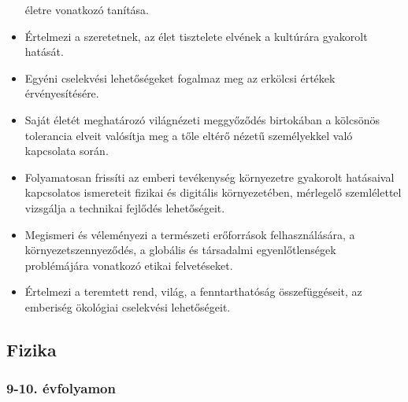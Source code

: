 \begin{itemize}
  életre vonatkozó tanítása.
\item
  Értelmezi a szeretetnek, az élet tisztelete elvének a kultúrára
  gyakorolt hatását.
\item
  Egyéni cselekvési lehetőségeket fogalmaz meg az erkölcsi értékek
  érvényesítésére.
\item
  Saját életét meghatározó világnézeti meggyőződés birtokában a
  kölcsönös tolerancia elveit valósítja meg a tőle eltérő nézetű
  személyekkel való kapcsolata során.
\item
  Folyamatosan frissíti az emberi tevékenység környezetre gyakorolt
  hatásaival kapcsolatos ismereteit fizikai és digitális környezetében,
  mérlegelő szemlélettel vizsgálja a technikai fejlődés lehetőségeit.
\item
  Megismeri és véleményezi a természeti erőforrások felhasználására, a
  környezetszennyeződés, a globális és társadalmi egyenlőtlenségek
  problémájára vonatkozó etikai felvetéseket.
\item
  Értelmezi a teremtett rend, világ, a fenntarthatóság összefüggéseit,
  az emberiség ökológiai cselekvési lehetőségeit.
\end{itemize}

\hypertarget{fizika}{%
\subsection{Fizika}\label{fizika}}

\hypertarget{evfolyamon-16}{%
\subsubsection{9-10. évfolyamon}\label{evfolyamon-16}}

